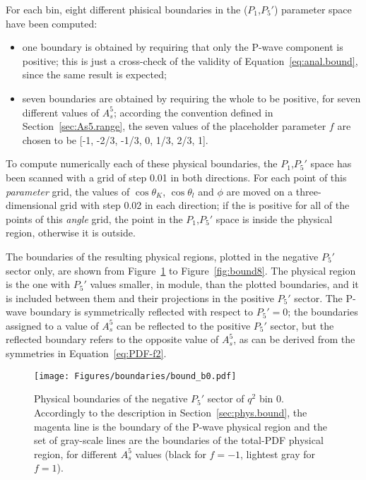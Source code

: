
For each bin, eight different phisical boundaries in the ($P_1$,$P_5'$) parameter space have been computed:
\begin{itemize}
\item one boundary is obtained by requiring that only the P-wave component is positive; this is just a cross-check of the validity of Equation~\ref{eq:anal.bound}, since the same result is expected;
\item seven boundaries are obtained by requiring the whole \pdf to be positive, for seven different values of $A_s^5$; according the convention defined in Section~\ref{sec:As5.range}, the seven values of the placeholder parameter $f$ are chosen to be [-1, -2/3, -1/3, 0, 1/3, 2/3, 1].
\end{itemize}

To compute numerically each of these physical boundaries, the $P_1$,$P_5'$ space has been scanned with a grid of step 0.01 in both directions.
For each point of this \textit{parameter} grid, the values of $\cos\theta_K$, $\cos\theta_l$ and $\phi$ are moved on a three-dimensional grid with step 0.02 in each direction; if the \pdf is positive for all of the points of this \textit{angle} grid, the point in the $P_1$,$P_5'$ space is inside the physical region, otherwise it is outside.

The boundaries of the resulting physical regions, plotted in the negative $P_5'$ sector only, are shown from Figure~\ref{fig:bound0} to Figure~\ref{fig:bound8}.
The physical region is the one with $P_5'$ values smaller, in module, than the plotted boundaries, and it is included between them and their projections in the positive $P_5'$ sector. 
The P-wave boundary is symmetrically reflected with respect to $P_5'=0$; the boundaries assigned to a value of $A_s^5$ can be reflected to the positive $P_5'$ sector, but the reflected boundary refers to the opposite value of $A_s^5$, as can be derived from the symmetries in Equation~\ref{eq:PDF-f2}.

\begin{figure}[!hbt]
  \centering
  \texttt{[image: Figures/boundaries/bound\_b0.pdf]}
  \caption{Physical boundaries of the negative $P_5'$ sector of $q^2$ bin 0.
    Accordingly to the description in Section~\ref{sec:phys.bound}, the magenta line is the boundary of the P-wave physical region and the set of gray-scale lines are the boundaries of the total-PDF physical region, for different $A_s^5$ values (black for $f=-1$, lightest gray for $f=1$).}
  \label{fig:bound0}
\end{figure}

